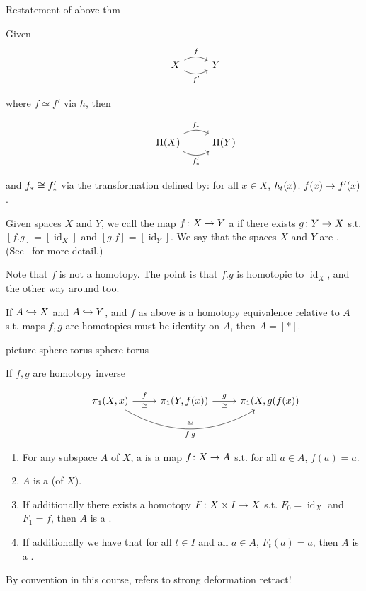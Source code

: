 \documentclass[11pt,leqno,oneside]{amsart}
\numberwithin{thm}{section}
\newcommand{\homotopic}{\simeq}
\newcommand{\fund}[1][1]{\pi_{#1}}
\newcommand{\x}{\times}
\newcommand{\id}{\operatorname{id}}
\begin{document}
\begin{thm}
  Restatement of above thm

  Given
  $$\begin{tikzcd}
    &X \arrow[r, bend left, "f"] \arrow[r, bend right, "f'"'] &Y
  \end{tikzcd}$$

  where $f \homotopic f'$ via $h$, then

  $$\begin{tikzcd}
    &\Pi(X) \arrow[r, bend left, "f_*"] \arrow[r, bend right, "f_*'"'] &\Pi(Y)
  \end{tikzcd}$$

  and $f_* \mathrel{\cong} f_*'$ via the transformation defined by: for all $x \in X$, $h_t(x)\colon f(x) \to f'(x)$.
\end{thm}
\begin{defn}
  Given spaces $X$ and $Y$, we call the map $f\colon X \to Y$ a  if there exists $g\colon Y \to X$ s.t. $[f.g] = [\id_X]$ and $[g.f] = [\id_Y]$.  We say that the spaces $X$ and $Y$ are . (See~\cite{heq} for more detail.)
\end{defn}
\begin{rmk}
  Note that $f$ is not a homotopy.  The point is that $f.g$ is homotopic to $\id_X$, and the other way around too.
\end{rmk}
\begin{rmk}
  If $A \hookrightarrow X$ and $A \hookrightarrow Y$, and $f$ as above is a homotopy equivalence relative to $A$ s.t. maps $f,g$ are homotopies must be identity on $A$, then $A = [*]$.

  picture sphere torus sphere torus

  If $f,g$ are homotopy inverse

  $$\begin{tikzcd}
    &\fund(X,x) \arrow[r, "f", "\isom"'] \arrow[rr, bend right, "\isom", "f.g"'] &\fund(Y, f(x)) \arrow[r, "g", "\isom"'] &\fund(X, g(f(x))
  \end{tikzcd}$$
\end{rmk}
\begin{defn}
  \mbox{}
  \begin{enumerate}
    \item For any subspace $A$ of $X$, a  is a map $f\colon X \to A$ s.t. for all $a \in A$, $f(a) = a$.

    \item $A$ is a  (of $X$).

    \item If additionally there exists a homotopy $F\from X \x I \to X$ s.t. $F_0 = \id_X$ and $F_1 = f$, then $A$ is a .

    \item If additionally we have that for all $t \in I$ and all $a \in A$, $F_t(a) = a$, then $A$ is a .
  \end{enumerate}
  By convention in this course,  refers to strong deformation retract!
\end{defn}
\end{document}
